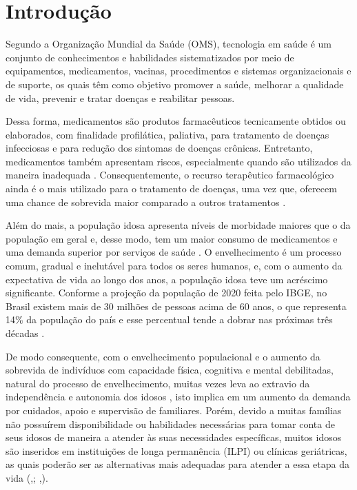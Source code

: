 \makeatletter\@openrightfalse

\chapter[Introdução]{Introdução}

Segundo a Organização Mundial da Saúde (OMS), tecnologia em saúde é um conjunto de conhecimentos e habilidades sistematizados por meio de equipamentos, medicamentos, vacinas, procedimentos e sistemas organizacionais e de suporte, os quais têm como objetivo promover a saúde, melhorar a qualidade de vida, prevenir e tratar doenças e reabilitar pessoas.\cite{OMS_2010}

Dessa forma, medicamentos são produtos farmacêuticos tecnicamente obtidos ou elaborados, com finalidade profilática, paliativa, para tratamento de doenças infecciosas e para redução dos sintomas de doenças crônicas. Entretanto, medicamentos também apresentam riscos, especialmente quando são utilizados da maneira inadequada \cite{Gimenes2016}. Consequentemente, o recurso terapêutico farmacológico ainda é o mais utilizado para o tratamento de doenças, uma vez que, oferecem uma chance de sobrevida maior comparado a outros tratamentos \cite{Dal_2012}.

Além do mais, a população idosa apresenta níveis de morbidade maiores que o da população em geral e, desse modo, tem um maior consumo de medicamentos e uma demanda superior por serviços de saúde \cite{Dal_2012}. O envelhecimento é um processo comum, gradual e inelutável para todos os seres humanos, e, com o aumento da expectativa de vida ao longo dos anos, a população idosa teve um acréscimo significante. Conforme a projeção da população de 2020 feita pelo IBGE, no Brasil existem mais de 30 milhões de pessoas acima de 60 anos, o que representa 14\% da população do país e esse percentual tende a dobrar nas próximas três décadas \cite{IBGE_2020}.  

De modo consequente, com o envelhecimento populacional e o aumento da sobrevida de indivíduos com capacidade física, cognitiva e mental debilitadas, natural do processo de envelhecimento, muitas vezes leva ao extravio da independência e autonomia dos idosos \cite{Freitas_2006}, isto implica em um aumento da demanda por cuidados, apoio e supervisão de familiares. Porém, devido a muitas famílias não possuírem disponibilidade ou habilidades necessárias para tomar conta de seus idosos de maneira a atender às suas necessidades específicas, muitos idosos são inseridos em instituições de longa permanência (ILPI) ou clínicas geriátricas, as quais poderão ser as alternativas mais adequadas para atender a essa etapa da vida (\citeauthor{Ipea},\citeyear{Ipea}; \citeauthor{Silva2013},\citeyear{Silva2013}).

